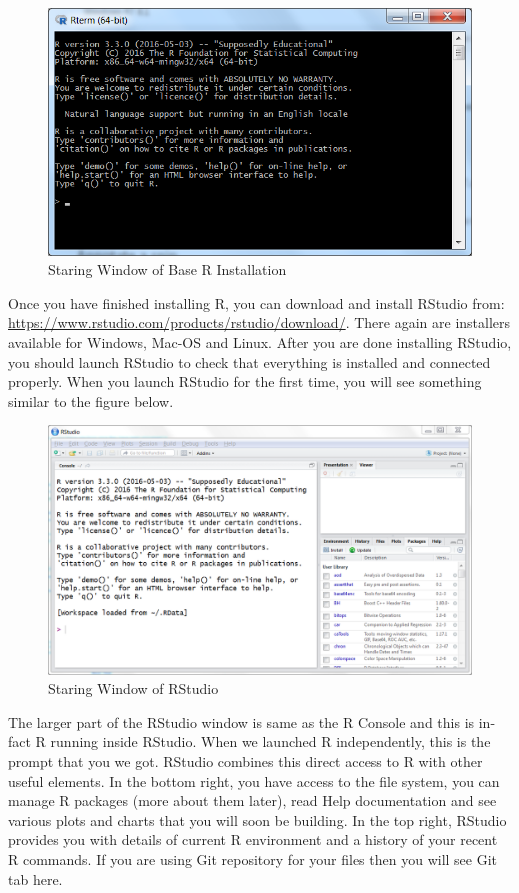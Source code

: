 \documentclass[]{krantz}
\theoremstyle{definition}
\theoremstyle{definition}
\theoremstyle{definition}
\theoremstyle{remark}
\begin{document}
\begin{figure}
\centering
\includegraphics{images/rbase.png}
\caption{Staring Window of Base R Installation}
\end{figure}

Once you have finished installing R, you can download and install
RStudio from: \url{https://www.rstudio.com/products/rstudio/download/}.
There again are installers available for Windows, Mac-OS and Linux.
After you are done installing RStudio, you should launch RStudio to
check that everything is installed and connected properly. When you
launch RStudio for the first time, you will see something similar to the
figure below.

\begin{figure}
\centering
\includegraphics{images/rstudio.png}
\caption{Staring Window of RStudio}
\end{figure}

The larger part of the RStudio window is same as the R Console and this
is in-fact R running inside RStudio. When we launched R independently,
this is the prompt that you we got. RStudio combines this direct access
to R with other useful elements. In the bottom right, you have access to
the file system, you can manage R packages (more about them later), read
Help documentation and see various plots and charts that you will soon
be building. In the top right, RStudio provides you with details of
current R environment and a history of your recent R commands. If you
are using Git repository for your files then you will see Git tab here.
\end{document}
